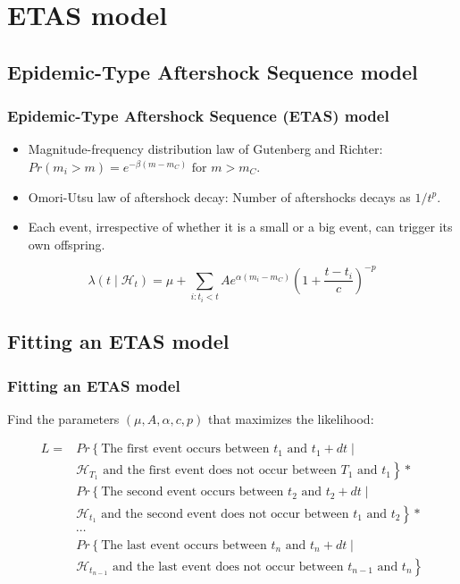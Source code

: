 \documentclass{beamer}
\begin{document}
	\section{ETAS model}
	\subsection{Epidemic-Type Aftershock Sequence model}

	\begin{frame}
		\frametitle{Epidemic-Type Aftershock Sequence (ETAS) model}
		\begin{itemize}
			\item Magnitude-frequency distribution law of Gutenberg and Richter: $Pr \left( m_i > m \right) = e^{- \beta \left( m - m_C \right)} \text{ for } m > m_C$.
			\item Omori-Utsu law of aftershock decay: Number of aftershocks decays as $1 / t^p$.
			\item Each event, irrespective of whether it is a small or a big event, can trigger its own offspring.
		\end{itemize}

		\begin{equation*}
		\lambda \left( t \mid \mathcal{H}_t \right) = \mu + \sum_{i : t_i < t} A e^{\alpha \left( m_i - m_C \right)} \left( 1 + \frac{t - t_i}{c} \right) ^{-p}
		\end{equation*}		
	\end{frame}

	\subsection{Fitting an ETAS model}

	\begin{frame}
		\frametitle{Fitting an ETAS model}
		Find the parameters $\left( \mu , A , \alpha , c , p \right)$ that maximizes the likelihood:

		\begin{equation*}
		\begin{aligned}
		L = & Pr \left\{ \text{The first event occurs between } t_1 \text{ and } t_1 + dt \mid \right. \\
		& \left. \mathcal{H}_{T_1} \text{ and the first event does not occur between } T_1 \text{ and } t_1 \right\} * \\
		& Pr \left\{ \text{The second event occurs between } t_2 \text{ and } t_2 + dt \mid \right. \\
		& \left. \mathcal{H}_{t_1} \text{ and the second event does not occur between } t_1 \text{ and } t_2 \right\} * \\
		& \cdots \\
		& Pr \left\{ \text{The last event occurs between } t_n \text{ and } t_n + dt \mid \right. \\
		& \left. \mathcal{H}_{t_{n - 1}} \text{ and the last event does not occur between } t_{n - 1} \text{ and } t_n \right\}
		\end{aligned}
    		\end{equation*}
	\end{frame}
\end{document}
